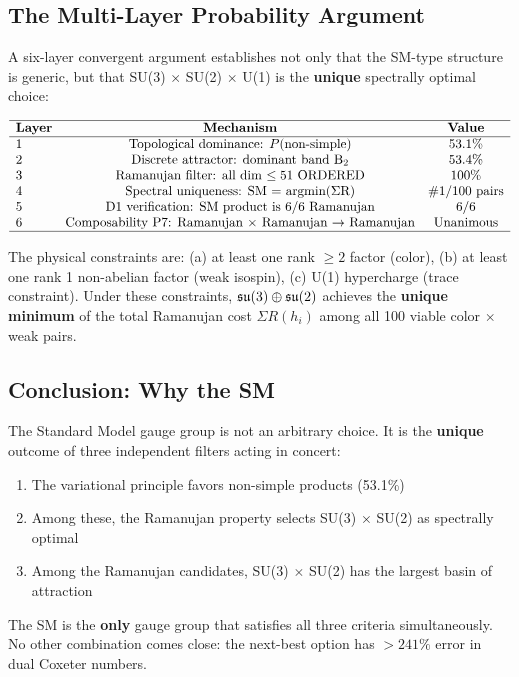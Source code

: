 \subsection{The Multi-Layer Probability Argument}\label{sec:multi_layer}

A six-layer convergent argument establishes not only that the SM-type structure is generic, but that SU(3) $\times$ SU(2) $\times$ U(1) is the \textbf{unique} spectrally optimal choice:

\begin{equation}
\begin{array}{lcc}
\hline
\textbf{Layer} & \textbf{Mechanism} & \textbf{Value} \\
\hline
1 & \text{Topological dominance: } P(\text{non-simple}) & 53.1\% \\
2 & \text{Discrete attractor: dominant band B}_2 & 53.4\% \\
3 & \text{Ramanujan filter: all dim $\leq 51$ ORDERED} & 100\% \\
4 & \text{Spectral uniqueness: SM = argmin($\Sigma$R)} & \text{\#1/100 pairs} \\
5 & \text{D1 verification: SM product is 6/6 Ramanujan} & 6/6 \\
6 & \text{Composability P7: Ramanujan $\times$ Ramanujan $\to$ Ramanujan} & \text{Unanimous} \\
\hline
\end{array}
\end{equation}

The physical constraints are: (a) at least one rank $\geq 2$ factor (color), (b) at least one rank 1 non-abelian factor (weak isospin), (c) U(1) hypercharge (trace constraint). Under these constraints, $\mathfrak{su}(3) \oplus \mathfrak{su}(2)$ achieves the \textbf{unique minimum} of the total Ramanujan cost $\Sigma R(h_i)$ among all 100 viable color $\times$ weak pairs.

\subsection{Conclusion: Why the SM}

The Standard Model gauge group is not an arbitrary choice. It is the \textbf{unique} outcome of three independent filters acting in concert:

\begin{enumerate}
\item The variational principle favors non-simple products (53.1\%)
\item Among these, the Ramanujan property selects SU(3) $\times$ SU(2) as spectrally optimal
\item Among the Ramanujan candidates, SU(3) $\times$ SU(2) has the largest basin of attraction
\end{enumerate}

The SM is the \textbf{only} gauge group that satisfies all three criteria simultaneously. No other combination comes close: the next-best option has $> 241\%$ error in dual Coxeter numbers.
